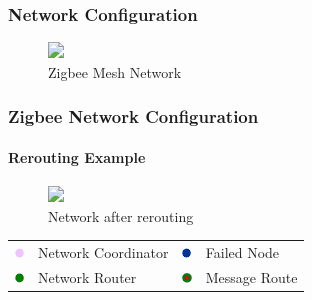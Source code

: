\documentclass{beamer}
\theoremstyle{definition} \newtheorem{mdefinition}{Definition}
\theoremstyle{plain} \newtheorem{mtheorem}{Theorem}
\theoremstyle{plain} \newtheorem{mcorollary}{Corollary}
\theoremstyle{plain} \newtheorem{mfact}{Fact}
\begin{document}
\begin{frame}
  \frametitle{Network Configuration}
  \begin{figure}
    \includegraphics<1>[width=0.6\textwidth]{img/mesh-routing1.png} 
    \caption{Zigbee Mesh Network}
  \end{figure}
\end{frame}

\begin{frame}
  \frametitle{Zigbee Network Configuration}
  \framesubtitle{Rerouting Example}
  \begin{figure}
    \includegraphics<1>[width=0.6\textwidth]{img/mesh-routing2.png} 
    \caption{Network after rerouting}
  \end{figure}
  \begin{tabular}{llll}
    \includegraphics[height=0.1in]{img/pink.png} & Network Coordinator & \includegraphics[height=0.1in]{img/blue} & Failed Node
 \\
    \includegraphics[height=0.1in]{img/green} & Network Router & \includegraphics[height=0.1in]{img/route} & Message Route 
\\
  \end{tabular}
\end{frame}

  
\end{document}

